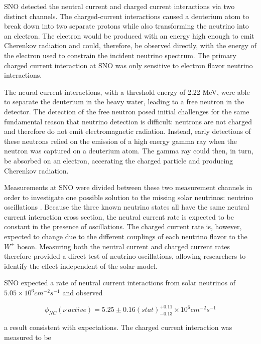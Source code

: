 SNO detected the neutral current and charged current interactions via two distinct channels. 
The charged-current interactions caused a deuterium atom to break down into two separate protons while also transforming the neutrino into an electron.
The electron would be produced with an energy high enough to emit Cherenkov radiation and could, therefore, be observed directly, with the energy of the electron used to constrain the incident neutrino spectrum.
The primary charged current interaction at SNO was only sensitive to electron flavor neutrino interactions.

The neural current interactions, with a threshold energy of 2.22 MeV, were able to separate the deuterium in the heavy water, leading to a free neutron in the detector. 
The detection of the free neutron posed initial challenges for the same fundamental reason that neutrino detection is difficult: neutrons are not charged and therefore do not emit electromagnetic radiation.
Instead, early detections of these neutrons relied on the emission of a high energy gamma ray when the neutron was captured on a deuterium atom.
The gamma ray could then, in turn, be absorbed on an electron, accerating the charged particle and producing Cherenkov radiation.

Measurements at SNO were divided between these two measurement channels in order to investigate one possible solution to the missing solar neutrinos: neutrino oscillations \cite{SNO-Proposal}.
Because the three known neutrino states all have the same neutral current interaction cross section, the neutral current rate is expected to be constant in the presence of oscillations.
The charged current rate is, however, expected to change due to the different couplings of each neutrino flavor to the $W^{\pm}$ boson.
Measuring both the neutral current and charged current rates therefore provided a direct test of neutrino oscillations, allowing researchers to identify the effect independent of the solar model.

SNO expected a rate of neutral current interactions from solar neutrinos of $5.05 \times 10^6 cm^{-2} s^{-1}$ and observed 

\begin{equation}
\phi_{NC}\left(\nu \ active \right) = 5.25 \pm 0.16 (stat) ^{+0.11}_{-0.13} \times 10^6 cm^{-2} s^{-1}
\end{equation}

a result consistent with expectations.
The charged current interaction was measured to be

